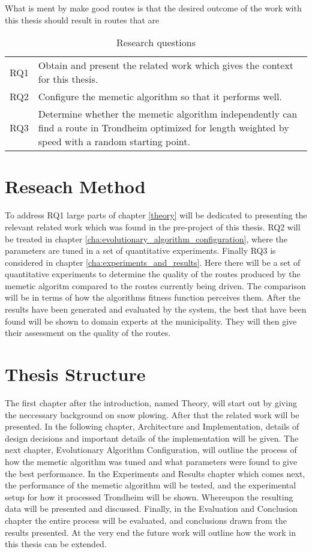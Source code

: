 What is ment by make good routes is that the desired outcome of the work with this thesis should result in routes that are 

\begin{table}[H]
\centering
\begin{tabular}{cp{}}
RQ1  &  Obtain and present the related work which gives the context for this thesis. \\
RQ2  &  Configure the memetic algorithm so that it performs well.\\
RQ3  &  Determine whether the memetic algorithm independently can find a route in Trondheim optimized for length weighted by speed with a random starting point. \\
\end{tabular}
\caption{Research questions}
\label{tab:research_questions}
\end{table}

\section{Reseach Method}

To address RQ1 large parts of chapter \ref{theory} will be dedicated to presenting the relevant related work which was found in the pre-project of this thesis. RQ2 will be treated in chapter \ref{cha:evolutionary_algorithm_configuration}, where the parameters are tuned in a set of quantitative experiments. Finally RQ3 is considered in chapter \ref{cha:experiments_and_results}. Here there will be a set of quantitative experiments to determine the quality of the routes produced by the memetic algoritm compared to the routes currently being driven. The comparison will be in terms of how the algorithms fitness function perceives them. After the results have been generated and evaluated by the system, the best that have been found will be shown to domain experts at the municipality. They will then give their assessment on the quality of the routes.

\section{Thesis Structure}

The first chapter after the introduction, named Theory, will start out by giving the neccessary background on snow plowing. After that the related work will be presented. In the following chapter, Architecture and Implementation, details of design decisions and important details of the implementation will be given. The next chapter, Evolutionary Algorithm Configuration, will outline the process of how the memetic algorithm was tuned and what parameters were found to give the best performance. In the Experiments and Results chapter which comes next, the performance of the memetic algorithm will be tested, and the experimental setup for how it processed Trondheim will be shown. Whereupon the resulting data will be presented and discussed. Finally, in the Evaluation and Conclusion chapter the entire process will be evaluated, and conclusions drawn from the results presented. At the very end the future work will outline how the work in this thesis can be extended.

\cleardoublepage
